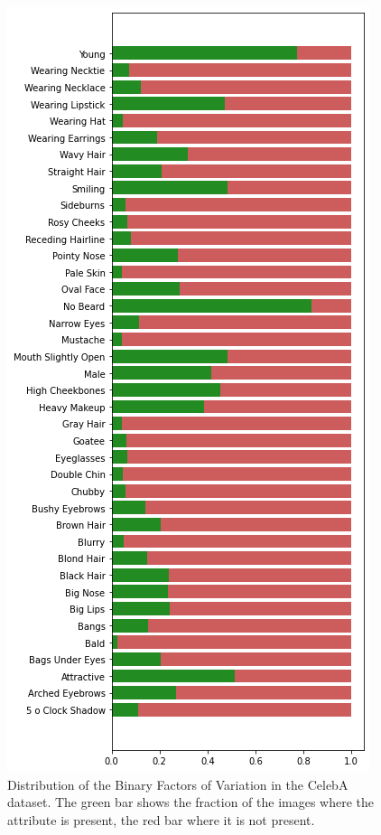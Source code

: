 \begin{figure}
    \centering
    \includegraphics[height=.39\textheight]{images/latent_spaces/celeba/attribute_distribution.png}
    \caption[CelebA: Feature Distribution]{Distribution of the Binary Factors of Variation in the CelebA dataset. The green bar shows the fraction of the images where the attribute is present, the red bar where it is not present.}
    \label{fig:celeba_features_distribution}
\end{figure}

